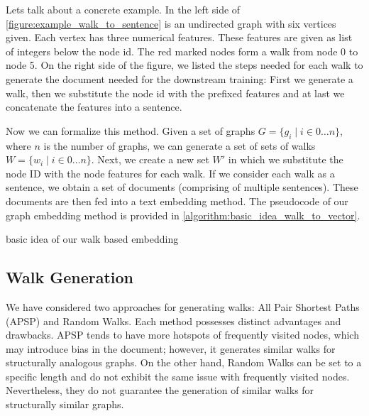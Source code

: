 Lets talk about a concrete example. In the left side of \autoref{figure:example_walk_to_sentence} is an undirected graph with six vertices given. Each vertex has three numerical features. These features are given as list of integers below the node id. The red marked nodes form a walk from node 0 to node 5. On the right side of the figure, we listed the steps needed for each walk to generate the document needed for the downstream training: First we generate a walk, then we substitute the node id with the prefixed features and at last we concatenate the features into a sentence.

Now we can formalize this method. Given a set of graphs $G = \{ g_i \mid i \in 0 \dots n \}$, where $n$ is the number of graphs, we can generate a set of sets of walks $W = \{ w_i \mid i \in 0 \dots n \}$. Next, we create a new set $W'$ in which we substitute the node ID with the node features for each walk. If we consider each walk as a sentence, we obtain a set of documents (comprising of multiple sentences). These documents are then fed into a text embedding method. The pseudocode of our graph embedding method is provided in \autoref{algorithm:basic_idea_walk_to_vector}.

\begin{minipage}{\linewidth}
    \begin{algorithm}[H]
        \DontPrintSemicolon



        \caption{basic idea of our walk based embedding}
        \label{algorithm:basic_idea_walk_to_vector}
    \end{algorithm}
\end{minipage}


\subsection{Walk Generation}
We have considered two approaches for generating walks: All Pair Shortest Paths (APSP) and Random Walks. Each method possesses distinct advantages and drawbacks. APSP tends to have more hotspots of frequently visited nodes, which may introduce bias in the document; however, it generates similar walks for structurally analogous graphs. On the other hand, Random Walks can be set to a specific length and do not exhibit the same issue with frequently visited nodes. Nevertheless, they do not guarantee the generation of similar walks for structurally similar graphs.

